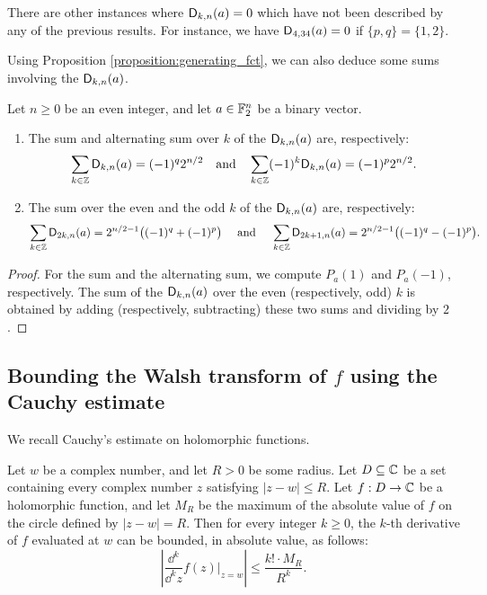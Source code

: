 \documentclass[11pt]{llncs}
\begin{document}
\begin{remark}
    There are other instances where $\Dnka nka=0$ which have not been described by any of the previous results. For instance, we have $\Dnka{34}4a=0$ if $\{p,q\}=\{1,2\}$.
\end{remark}

Using Proposition \ref{proposition:generating_fct}, we can also deduce some sums involving the $\Dnka nka$.

\begin{proposition}
    Let $n\geq 0$ be an even integer, and let $a\in\F_2^n$ be a binary vector.
    \begin{enumerate}
        \item The sum and alternating sum over $k$ of the $\Dnka nka$ are, respectively:
		\[
			\sum_{k\in\Z}\Dnka nka=(-1)^{q}2^{n/2} \quad \text{and} \quad
			\sum_{k\in\Z}(-1)^k\Dnka nka=(-1)^{p}2^{n/2}.
		\]
        \item The sum over the even and the odd $k$ of the $\Dnka nka$ are, respectively:
		\[
			\sum_{k\in\Z}\Dnka n{2k}a=2^{n/2-1}\big((-1)^{q}+(-1)^{p}\big) \quad \text{ and } \quad 
			\sum_{k\in\Z}\Dnka n{2k+1}a=2^{n/2-1}\big((-1)^{q}-(-1)^{p}\big).
		\]
    \end{enumerate}
\end{proposition}

\begin{proof}
	For the sum and the alternating sum, we compute $P_a(1)$ and $P_a(-1)$, respectively. 
	The sum of the $\Dnka nka$ over the even (respectively, odd) $k$ is obtained by adding (respectively, subtracting) these two sums and dividing by $2$.
\end{proof}

\subsection{Bounding the Walsh transform of $f$ using the Cauchy estimate}\label{sec:Cauchy}

We recall Cauchy's estimate on holomorphic functions.

\begin{Prop}\label{property:cauchy_estimate}
    Let $w$ be a complex number, and let $R>0$ be some radius. Let $D\subseteq\C$ be a set containing every complex number $z$ satisfying $|z-w|\leq R$. Let $f:D\to\C$ be a holomorphic function, and let $M_R$ be the maximum of the absolute value of $f$ on the circle defined by $|z-w|=R$. Then for every integer $k\geq 0$, the $k$-th derivative of $f$ evaluated at $w$ can be bounded, in absolute value, as follows:
    \[
        \left|\frac{\dd^k}{\dd^k z}f(z)\vert_{z=w}\right|\leq\frac{k!\cdot M_R}{R^k}.
    \]
\end{Prop}
\end{document}
